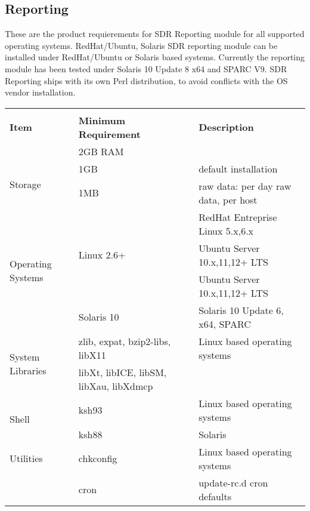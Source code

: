 \subsection*{Reporting}
\noindent
These are the product requierements for SDR Reporting module for all supported
operating systems. RedHat/Ubuntu, Solaris SDR reporting module can be 
installed under RedHat/Ubuntu or Solaris based systems. Currently
the reporting module has been tested under Solaris 10 Update 8 x64 and
SPARC V9. SDR Reporting ships with its own Perl distribution, to avoid conflicts 
with the OS vendor installation.

\begin{center}
\begin{tabular}{lll}

\multicolumn{3}{c}{} \\
 \rowcolor{blue!25}
 \textbf{Item} & \textbf{Minimum Requirement} & \textbf{Description} \\
 \hline
 \newline

\multirow{1}{*}{\small{Memory}} &
 \small{2GB RAM} & \small{} \\
 \hline

\multirow{2}{*}{\small{Storage}} &
 \small{1GB} & \small{default installation} \\ &
 \small{1MB} & \small{raw data: per day raw data, per host} \\
 \hline

\multirow{4}{*}{\small{Operating Systems}} &
 \small{} & \small{RedHat Entreprise Linux 5.x,6.x} \\ &
 \small{Linux 2.6+} & \small{Ubuntu Server 10.x,11,12+ LTS} \\ &
 \small{} & \small{Ubuntu Server 10.x,11,12+ LTS} \\ &
 \small{Solaris 10} & \small{Solaris 10 Update 6, x64, SPARC} \\
 \hline

\multirow{2}{*}{\small{System Libraries}} &
 \small{zlib, expat, bzip2-libs, libX11} & \small{Linux based operating systems} \\ &
 \small{libXt, libICE, libSM, libXau, libXdmcp} & \small{} \\
 \hline

\multirow{2}{*}{\small{Shell}} &
 \small{ksh93} & \small{Linux based operating systems} \\ &
 \small{ksh88} & \small{Solaris} \\
 \hline

\multirow{1}{*}{\small{Utilities}} &
 \small{chkconfig} & \small{Linux based operating systems} \\ &
 \small{cron} & \small{update-rc.d cron defaults} \\
 \hline

\end{tabular}
\end{center}


